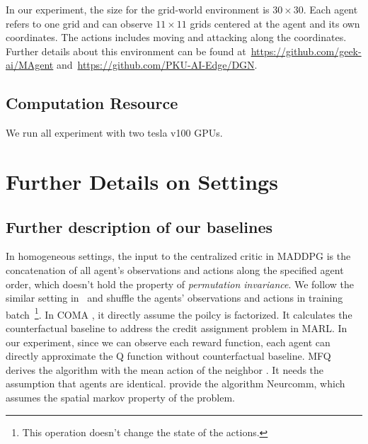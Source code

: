 \documentclass[11pt,a4paper]{article}
\theoremstyle{definition}
\begin{document}
In our experiment, the size for the grid-world environment is $30\times30$.
Each agent refers to one grid and can observe $11\times11$ grids centered at the agent and its own coordinates.
The actions includes moving and attacking along the coordinates. Further details about this environment can be found at~\url{https://github.com/geek-ai/MAgent} and~\url{https://github.com/PKU-AI-Edge/DGN}.

\subsection{Computation Resource }

We run all experiment with two tesla v100 GPUs.

\section{Further Details on Settings} \label{app:setting}

\subsection{Further description of our baselines}
\label{app:baseline}


In homogeneous settings, the input to the centralized critic in MADDPG is the concatenation of all agent's observations and actions along the specified agent order, which doesn't hold the property of \textit{permutation invariance}. We follow the similar setting in~\citep{liu2019pic} and shuffle the agents' observations and actions in training batch~\footnote{This operation doesn't change the state of the actions.}. In COMA \citep{foerster2018counterfactual}, it directly assume the poilcy is factorized. It calculates the counterfactual baseline  to address the credit assignment problem in MARL. In our experiment, since we can observe each reward function, each agent can directly approximate the Q function without counterfactual baseline. MFQ  derives the algorithm  with the mean action of the neighbor \citep{yang2018mean}.  It needs the assumption that agents are identical. \citet{chu2020multi} provide the algorithm Neurcomm, which assumes the spatial markov property of the problem. 
\end{document}
